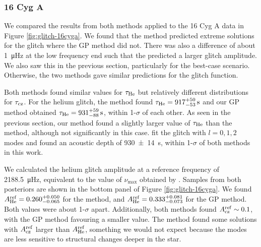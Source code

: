 
\subsubsection{16 Cyg A}

We compared the results from both methods applied to the 16 Cyg A data in Figure \ref{fig:glitch-16cyga}. We found that the  method predicted extreme solutions for the glitch where the GP method did not. There was also a difference of about \SI{1}{\micro\hertz} at the low frequency end such that the  predicted a larger glitch amplitude. We also saw this in the previous section, particularly for the best-case scenario. Otherwise, the two methods gave similar predictions for the glitch function.

Both methods found similar values for \(\tau_{{\mathrm{He}}}\) but relatively different distributions for \(\tau_{{\mathrm{cz}}}\). For the helium glitch, the  method found \(\tau_{{\mathrm{He}}} = 917_{-53}^{+50} \, \mathrm{s}\) and our GP method obtained \(\tau_{{\mathrm{He}}} = 931_{-88}^{+59} \, \mathrm{s}\), within 1-\(\sigma\) of each other. As seen in the previous section, our method found a slightly larger value of \(\tau_{{\mathrm{He}}}\) than the  method, although not significantly in this case. \citet{Verma.Faria.ea2014} fit the glitch with \(l=0,1,2\) modes and found an acoustic depth of \SI{930(14)}{\second}, within 1-\(\sigma\) of both methods in this work.

We calculated the helium glitch amplitude at a reference frequency of \SI{2188.5}{\micro\hertz}, equivalent to the value of \(\nu_{\max}\) obtained by \citet{Lund.SilvaAguirre.ea2017}. Samples from both posteriors are shown in the bottom panel of Figure \ref{fig:glitch-16cyga}. We found \(A_{{\mathrm{He}}}^\mathrm{ref} = 0.260_{-0.065}^{+0.050}\) for the  method, and \(A_{{\mathrm{He}}}^\mathrm{ref} = 0.333_{-0.073}^{+0.081}\) for the GP method. Both values were about 1-\(\sigma\) apart. Additionally, both methods found \(A_{{\mathrm{cz}}}^\mathrm{ref} \sim 0.1\), with the GP method favouring a smaller value. The  method found some solutions with \(A_{{\mathrm{cz}}}^\mathrm{ref}\) larger than \(A_{{\mathrm{He}}}^\mathrm{ref}\), something we would not expect because the modes are less sensitive to structural changes deeper in the star.

